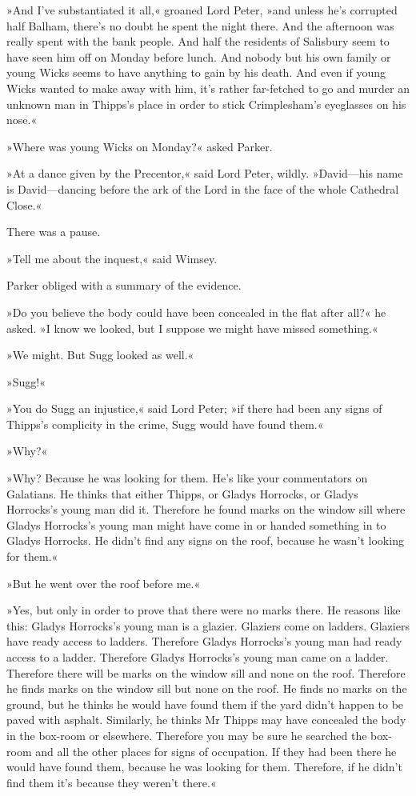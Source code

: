 »And I've substantiated it all,« groaned Lord Peter, »and unless he's corrupted half Balham, there's no doubt he spent the night there. And the afternoon was really spent with the bank people. And half the residents of Salisbury seem to have seen him off on Monday before lunch. And nobody but his own family or young Wicks seems to have anything to gain by his death. And even if young Wicks wanted to make away with him, it's rather far-fetched to go and murder an unknown man in Thipps's place in order to stick Crimplesham's eyeglasses on his nose.«

»Where was young Wicks on Monday?« asked Parker.

»At a dance given by the Precentor,« said Lord Peter, wildly. »David\allowbreak---\allowbreak his name is David\allowbreak---\allowbreak dancing before the ark of the Lord in the face of the whole Cathedral Close.«

There was a pause.

»Tell me about the inquest,« said Wimsey.

Parker obliged with a summary of the evidence.

»Do you believe the body could have been concealed in the flat after all?« he asked. »I know we looked, but I suppose we might have missed something.«

»We might. But Sugg looked as well.«

»Sugg!«

»You do Sugg an injustice,« said Lord Peter; »if there had been any signs of Thipps's complicity in the crime, Sugg would have found them.«

»Why?«

»Why? Because he was looking for them. He's like your commentators on Galatians. He thinks that either Thipps, or Gladys Horrocks, or Gladys Horrocks's young man did it. Therefore he found marks on the window sill where Gladys Horrocks's young man might have come in or handed something in to Gladys Horrocks. He didn't find any signs on the roof, because he wasn't looking for them.«

»But he went over the roof before me.«

»Yes, but only in order to prove that there were no marks there. He reasons like this: Gladys Horrocks's young man is a glazier. Glaziers come on ladders. Glaziers have ready access to ladders. Therefore Gladys Horrocks's young man had ready access to a ladder. Therefore Gladys Horrocks's young man came on a ladder. Therefore there will be marks on the window sill and none on the roof. Therefore he finds marks on the window sill but none on the roof. He finds no marks on the ground, but he thinks he would have found them if the yard didn't happen to be paved with asphalt. Similarly, he thinks Mr Thipps may have concealed the body in the box-room or elsewhere. Therefore you may be sure he searched the box-room and all the other places for signs of occupation. If they had been there he would have found them, because he was looking for them. Therefore, if he didn't find them it's because they weren't there.«

